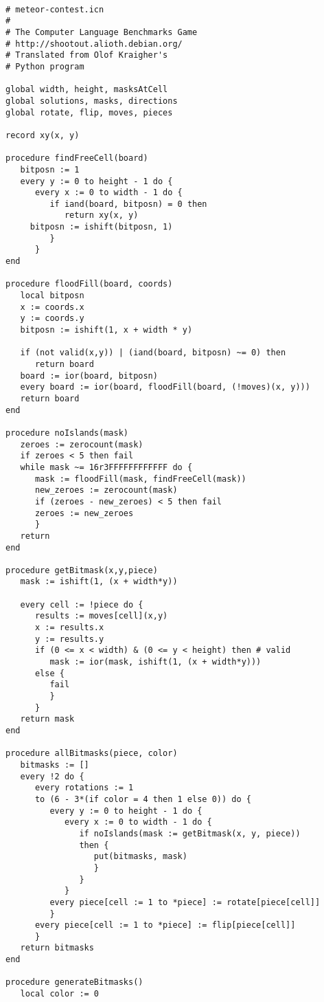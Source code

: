 \documentclass[letterpaper,12pt]{article}
\begin{document}
\begin{verbatim}

# meteor-contest.icn
#
# The Computer Language Benchmarks Game
# http://shootout.alioth.debian.org/
# Translated from Olof Kraigher's 
# Python program

global width, height, masksAtCell 
global solutions, masks, directions 
global rotate, flip, moves, pieces

record xy(x, y)

procedure findFreeCell(board)
   bitposn := 1
   every y := 0 to height - 1 do {
      every x := 0 to width - 1 do {
         if iand(board, bitposn) = 0 then
            return xy(x, y)
	 bitposn := ishift(bitposn, 1)
         }
      }
end

procedure floodFill(board, coords)
   local bitposn
   x := coords.x
   y := coords.y
   bitposn := ishift(1, x + width * y)
   
   if (not valid(x,y)) | (iand(board, bitposn) ~= 0) then
      return board
   board := ior(board, bitposn)
   every board := ior(board, floodFill(board, (!moves)(x, y)))
   return board
end

procedure noIslands(mask)
   zeroes := zerocount(mask)
   if zeroes < 5 then fail
   while mask ~= 16r3FFFFFFFFFFFF do {
      mask := floodFill(mask, findFreeCell(mask))
      new_zeroes := zerocount(mask)
      if (zeroes - new_zeroes) < 5 then fail
      zeroes := new_zeroes
      }
   return
end

procedure getBitmask(x,y,piece)
   mask := ishift(1, (x + width*y))

   every cell := !piece do {
      results := moves[cell](x,y)
      x := results.x
      y := results.y
      if (0 <= x < width) & (0 <= y < height) then # valid
         mask := ior(mask, ishift(1, (x + width*y)))
      else {
         fail
         }
      }
   return mask
end

procedure allBitmasks(piece, color)
   bitmasks := []
   every !2 do {
      every rotations := 1 
      to (6 - 3*(if color = 4 then 1 else 0)) do {
         every y := 0 to height - 1 do {
            every x := 0 to width - 1 do {
               if noIslands(mask := getBitmask(x, y, piece)) 
               then {
                  put(bitmasks, mask) 
                  }
               }
            }
         every piece[cell := 1 to *piece] := rotate[piece[cell]]
         }
      every piece[cell := 1 to *piece] := flip[piece[cell]]
      }
   return bitmasks
end

procedure generateBitmasks()
   local color := 0
   

\end{verbatim}
\end{document}
